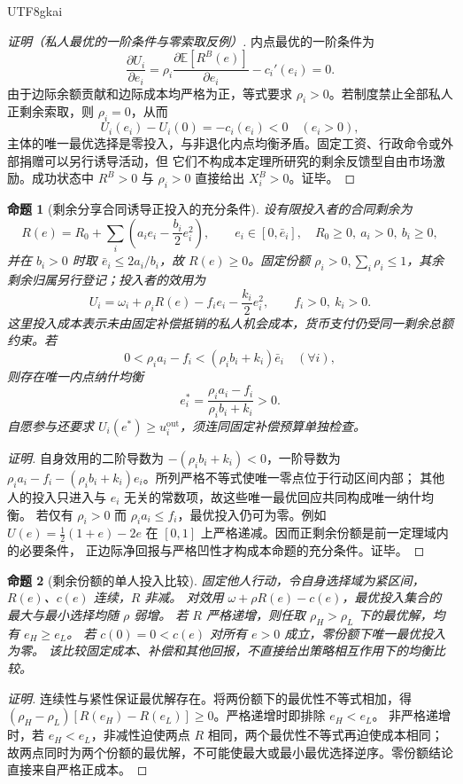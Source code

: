 \documentclass[12pt,a4paper,openany]{report}
\newtheorem{proposition}{命题}[chapter]
\newcommand{\EE}{\mathbb E}
\begin{document}
\begin{CJK*}{UTF8}{gkai}
\begin{proof}[证明（私人最优的一阶条件与零索取反例）]
内点最优的一阶条件为
\[
  \frac{\partial U_i}{\partial e_i}
  =
  \rho_i
  \frac{\partial\EE[R^B(e)]}{\partial e_i}
  -c_i'(e_i)
  =0.
\]
由于边际余额贡献和边际成本均严格为正，等式要求 \(\rho_i>0\)。若制度禁止全部私人正剩余索取，则
\(\rho_i=0\)，从而
\[
  U_i(e_i)-U_i(0)=-c_i(e_i)<0
  \quad(e_i>0),
\]
主体的唯一最优选择是零投入，与非退化内点均衡矛盾。固定工资、行政命令或外部捐赠可以另行诱导活动，但
它们不构成本定理所研究的剩余反馈型自由市场激励。成功状态中 \(R^B>0\) 与 \(\rho_i>0\) 直接给出
\(X_i^B>0\)。证毕。
\end{proof}

\begin{proposition}[剩余分享合同诱导正投入的充分条件]
\label{prop:residual-share-positive-effort}
设有限投入者的合同剩余为
\[
 R(e)=R_0+\sum_i\left(a_i e_i-\frac{b_i}{2}e_i^2\right),\qquad
 e_i\in[0,\bar e_i],\quad R_0\ge0,\ a_i>0,\ b_i\ge0,
\]
并在 \(b_i>0\) 时取 \(\bar e_i\le2a_i/b_i\)，故 \(R(e)\ge0\)。固定份额
\(\rho_i>0,\sum_i\rho_i\le1\)，其余剩余归属另行登记；投入者的效用为
\[
 U_i=\omega_i+\rho_iR(e)-f_ie_i-\frac{k_i}{2}e_i^2,\qquad f_i>0,\ k_i>0.
\]
这里投入成本表示未由固定补偿抵销的私人机会成本，货币支付仍受同一剩余总额约束。若
\[
 0<\rho_i a_i-f_i<(\rho_i b_i+k_i)\bar e_i\quad(\forall i),
\]
则存在唯一内点纳什均衡
\[
 e_i^*=\frac{\rho_i a_i-f_i}{\rho_i b_i+k_i}>0.
\]
自愿参与还要求 \(U_i(e^*)\ge u_i^{\mathrm{out}}\)，须连同固定补偿预算单独检查。
\end{proposition}

\begin{proof}[证明]
自身效用的二阶导数为 \(-(\rho_i b_i+k_i)<0\)，一阶导数为
\(\rho_i a_i-f_i-(\rho_i b_i+k_i)e_i\)。所列严格不等式使唯一零点位于行动区间内部；
其他人的投入只进入与 \(e_i\) 无关的常数项，故这些唯一最优回应共同构成唯一纳什均衡。
若仅有 \(\rho_i>0\) 而 \(\rho_i a_i\le f_i\)，最优投入仍可为零。例如
\(U(e)=\tfrac12(1+e)-2e\) 在 \([0,1]\) 上严格递减。因而正剩余份额是前一定理域内的必要条件，
正边际净回报与严格凹性才构成本命题的充分条件。证毕。
\end{proof}

\begin{proposition}[剩余份额的单人投入比较]
\label{prop:residual-share-monotone-response}
固定他人行动，令自身选择域为紧区间，\(R(e)\)、\(c(e)\) 连续，\(R\) 非减。
对效用 \(\omega+\rho R(e)-c(e)\)，最优投入集合的最大与最小选择均随 \(\rho\) 弱增。
若 \(R\) 严格递增，则任取 \(\rho_H>\rho_L\) 下的最优解，均有 \(e_H\ge e_L\)。
若 \(c(0)=0<c(e)\) 对所有 \(e>0\) 成立，零份额下唯一最优投入为零。
该比较固定成本、补偿和其他回报，不直接给出策略相互作用下的均衡比较。
\end{proposition}
\begin{proof}[证明]
连续性与紧性保证最优解存在。将两份额下的最优性不等式相加，得
\((\rho_H-\rho_L)[R(e_H)-R(e_L)]\ge0\)。严格递增时即排除 \(e_H<e_L\)。
非严格递增时，若 \(e_H<e_L\)，非减性迫使两点 \(R\) 相同，两个最优性不等式再迫使成本相同；
故两点同时为两个份额的最优解，不可能使最大或最小最优选择逆序。零份额结论直接来自严格正成本。
\end{proof}


\end{CJK*}
\end{document}
